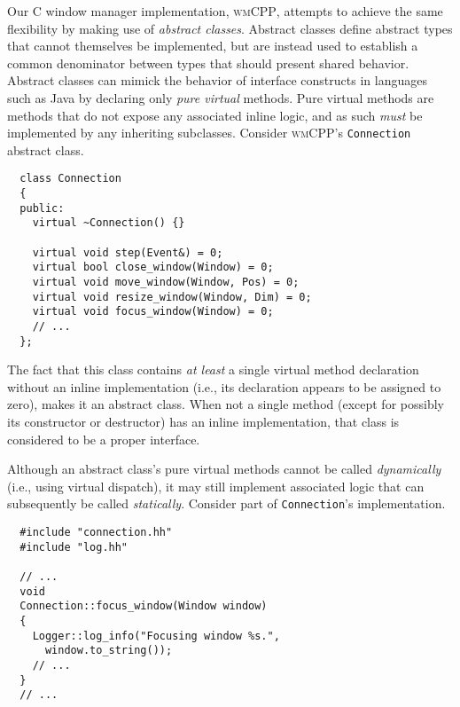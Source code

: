 Our  C\text{++}  window  manager  implementation,  \textsc{wmCPP},  attempts  to
achieve  the  same  flexibility  by making  use  of  \textit{abstract  classes}.
Abstract classes  define abstract types  that cannot themselves  be implemented,
but  are instead  used  to establish  a common  denominator  between types  that
should  present shared  behavior. Abstract  classes can  mimick the  behavior of
interface constructs  in languages such  as Java by declaring  only \textit{pure
virtual}  methods. Pure  virtual  methods are  methods that  do  not expose  any
associated  inline  logic, and  as  such  \textit{must}  be implemented  by  any
inheriting  subclasses.  Consider \textsc{wmCPP}'s  \texttt{Connection}
abstract class.


\begin{verbatim}
  class Connection
  {
  public:
    virtual ~Connection() {}
  
    virtual void step(Event&) = 0;
    virtual bool close_window(Window) = 0;
    virtual void move_window(Window, Pos) = 0;
    virtual void resize_window(Window, Dim) = 0;
    virtual void focus_window(Window) = 0;
    // ...
  };
\end{verbatim}

The fact  that this  class contains  \textit{at least}  a single  virtual method
declaration  without an  inline  implementation (i.e.,  its declaration  appears
to  be  assigned to  zero),  makes  it an  abstract  class.  When not  a  single
method  (except  for possibly  its  constructor  or  destructor) has  an  inline
implementation, that class is considered to be a proper interface.

Although   an  abstract   class's  pure   virtual  methods   cannot  be   called
\textit{dynamically}  (i.e., using  virtual  dispatch), it  may still  implement
associated logic  that can subsequently be  called \textit{statically}. Consider
part of \texttt{Connection}'s implementation.


\begin{verbatim}
  #include "connection.hh"
  #include "log.hh"

  // ...
  void
  Connection::focus_window(Window window)
  {
    Logger::log_info("Focusing window %s.",
      window.to_string());
    // ...
  }
  // ...
\end{verbatim}

